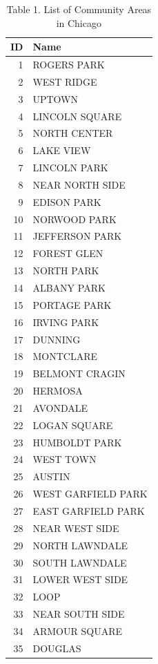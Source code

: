 \documentclass[
]{article}
\begin{document}
\begin{table}
\centering\centering
\caption{\label{tab:unnamed-chunk-3}Table 1.
List of Community Areas in Chicago}
\centering
\begin{tabular}[t]{r|l}
\hline
ID & Name\\
\hline
1 & ROGERS PARK\\
\hline
2 & WEST RIDGE\\
\hline
3 & UPTOWN\\
\hline
4 & LINCOLN SQUARE\\
\hline
5 & NORTH CENTER\\
\hline
6 & LAKE VIEW\\
\hline
7 & LINCOLN PARK\\
\hline
8 & NEAR NORTH SIDE\\
\hline
9 & EDISON PARK\\
\hline
10 & NORWOOD PARK\\
\hline
11 & JEFFERSON PARK\\
\hline
12 & FOREST GLEN\\
\hline
13 & NORTH PARK\\
\hline
14 & ALBANY PARK\\
\hline
15 & PORTAGE PARK\\
\hline
16 & IRVING PARK\\
\hline
17 & DUNNING\\
\hline
18 & MONTCLARE\\
\hline
19 & BELMONT CRAGIN\\
\hline
20 & HERMOSA\\
\hline
21 & AVONDALE\\
\hline
22 & LOGAN SQUARE\\
\hline
23 & HUMBOLDT PARK\\
\hline
24 & WEST TOWN\\
\hline
25 & AUSTIN\\
\hline
26 & WEST GARFIELD PARK\\
\hline
27 & EAST GARFIELD PARK\\
\hline
28 & NEAR WEST SIDE\\
\hline
29 & NORTH LAWNDALE\\
\hline
30 & SOUTH LAWNDALE\\
\hline
31 & LOWER WEST SIDE\\
\hline
32 & LOOP\\
\hline
33 & NEAR SOUTH SIDE\\
\hline
34 & ARMOUR SQUARE\\
\hline
35 & DOUGLAS\\

\end{tabular}
\end{table}
\end{document}
